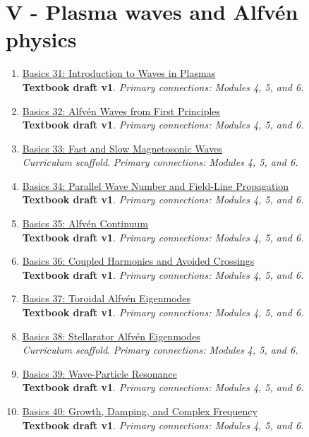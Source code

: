 \documentclass[11pt]{article}
\begin{document}
\section{V - Plasma waves and Alfvén physics}
\begin{enumerate}[leftmargin=2.4em]
\item[\textbf{31.}] \href{run:basics_31_introduction_to_waves_in_plasmas.pdf}{Basics 31: Introduction to Waves in Plasmas}\\[-0.2em]
\textbf{Textbook draft v1}. \textit{Primary connections: Modules 4, 5, and 6.}
\item[\textbf{32.}] \href{run:basics_32_alfven_waves_from_first_principles.pdf}{Basics 32: Alfv\'en Waves from First Principles}\\[-0.2em]
\textbf{Textbook draft v1}. \textit{Primary connections: Modules 4, 5, and 6.}
\item[\textbf{33.}] \href{run:basics_33_fast_and_slow_magnetosonic_waves.pdf}{Basics 33: Fast and Slow Magnetosonic Waves}\\[-0.2em]
\textit{Curriculum scaffold}. \textit{Primary connections: Modules 4, 5, and 6.}
\item[\textbf{34.}] \href{run:basics_34_parallel_wave_number_and_field_line_propagation.pdf}{Basics 34: Parallel Wave Number and Field-Line Propagation}\\[-0.2em]
\textbf{Textbook draft v1}. \textit{Primary connections: Modules 4, 5, and 6.}
\item[\textbf{35.}] \href{run:basics_35_alfven_continuum.pdf}{Basics 35: Alfv\'en Continuum}\\[-0.2em]
\textbf{Textbook draft v1}. \textit{Primary connections: Modules 4, 5, and 6.}
\item[\textbf{36.}] \href{run:basics_36_coupled_harmonics_and_avoided_crossings.pdf}{Basics 36: Coupled Harmonics and Avoided Crossings}\\[-0.2em]
\textbf{Textbook draft v1}. \textit{Primary connections: Modules 4, 5, and 6.}
\item[\textbf{37.}] \href{run:basics_37_toroidal_alfven_eigenmodes.pdf}{Basics 37: Toroidal Alfv\'en Eigenmodes}\\[-0.2em]
\textbf{Textbook draft v1}. \textit{Primary connections: Modules 4, 5, and 6.}
\item[\textbf{38.}] \href{run:basics_38_stellarator_alfven_eigenmodes.pdf}{Basics 38: Stellarator Alfv\'en Eigenmodes}\\[-0.2em]
\textit{Curriculum scaffold}. \textit{Primary connections: Modules 4, 5, and 6.}
\item[\textbf{39.}] \href{run:basics_39_wave_particle_resonance.pdf}{Basics 39: Wave-Particle Resonance}\\[-0.2em]
\textbf{Textbook draft v1}. \textit{Primary connections: Modules 4, 5, and 6.}
\item[\textbf{40.}] \href{run:basics_40_growth_damping_and_complex_frequency.pdf}{Basics 40: Growth, Damping, and Complex Frequency}\\[-0.2em]
\textbf{Textbook draft v1}. \textit{Primary connections: Modules 4, 5, and 6.}
\end{enumerate}
\end{document}
